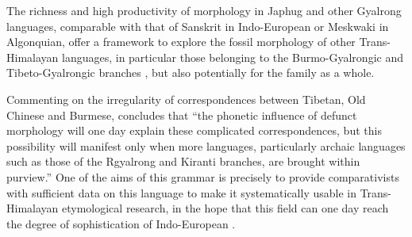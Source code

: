 The richness and high productivity of morphology in Japhug and other Gyalrong languages, comparable with that of Sanskrit in Indo-European or Meskwaki in Algonquian, offer a framework to explore the fossil morphology of other Trans-Himalayan languages, in particular those belonging to the Burmo-Gyalron\-gic and Tibeto-Gyalrongic branches \citep{jacques.michaud11naish, Sagart19ST}, but also potentially for the family as a whole. 
 
Commenting on the irregularity of correspondences between Tibetan, Old Chinese and Burmese, \citet[212]{hill2019phonology} concludes that ``the phonetic influence of defunct morphology will one day explain these complicated correspondences, but this possibility will manifest only when more languages, particularly archaic languages such as those of the Rgyalrong and Kiranti branches, are brought within purview.''  One of the aims of this grammar is precisely to provide comparativists with sufficient data on this language to make it  systematically usable in Trans-Himalayan etymological research, in the hope that this field can one day reach the degree of sophistication of Indo-European \citep{fellner19allofam}.
 
 